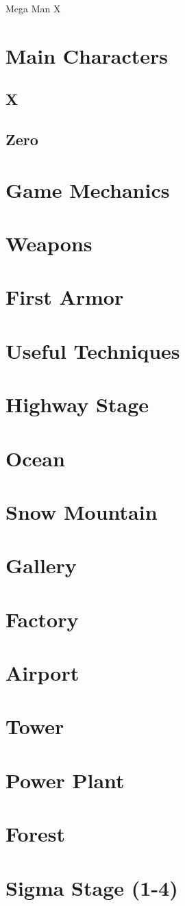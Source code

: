 \documentclass[openany]{report}
\begin{document}
\begin{chapter}{Mega Man X}
	\section{Main Characters}
	\subsection{X}
	\subsection{Zero}
	\section{Game Mechanics}
	\section{Weapons}
	\section{First Armor}
	\section{Useful Techniques}
	\section{Highway Stage}
	\section{Ocean}
	\section{Snow Mountain}
	\section{Gallery}
	\section{Factory}
	\section{Airport}
	\section{Tower}
	\section{Power Plant}
	\section{Forest}
	\section{Sigma Stage (1-4)}	
\end{chapter}


\end{document}
